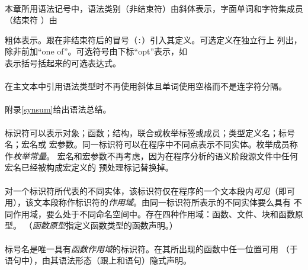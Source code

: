 
\paragraph{}
本章所用语法记号中，语法类别（非结束符）由斜体表示，字面单词和字符集成员（结束符
）由{粗体表示。跟在非结束符后的冒号（\texttt{:}）引入其定义。可选定义在独立行上
列出，除非前加``one of''。可选符号由下标``opt''表示，如                       \\
表示括号括起来的可选表达式。

\paragraph{}
在主文本中引用语法类型时不再使用斜体且单词使用空格而不是连字符分隔。

\paragraph{}
附录\ref{synsum}给出语法总结。


\paragraph{}
标识符可以表示对象；函数；结构，联合或枚举标签或成员；类型定义名；标号名；宏名或
宏参数。同一标识符可以在程序中不同点表示不同实体。枚举成员称作\textit{枚举常量}。
宏名和宏参数不再考虑，因为在程序分析的语义阶段源文件中任何宏名已经被构成宏定义的
预处理标记替换掉。

\paragraph{}
对一个标识符所代表的不同实体，该标识符仅在程序的一个文本段内\textit{可见}（即可
用），该文本段称作标识符的\textit{作用域}。由同一标识符所表示的不同实体要么具有
不同作用域，要么处于不同命名空间中。存在四种作用域：函数、文件、块和函数原型。
（\textit{函数原型}指定义函数类型的函数声明。）

\paragraph{}
标号名是唯一具有\textit{函数作用域}的标识符。在其所出现的函数中任一位置可用
（于语句中），由其语法形态（跟上\tm{:}和语句）隐式声明。

}
